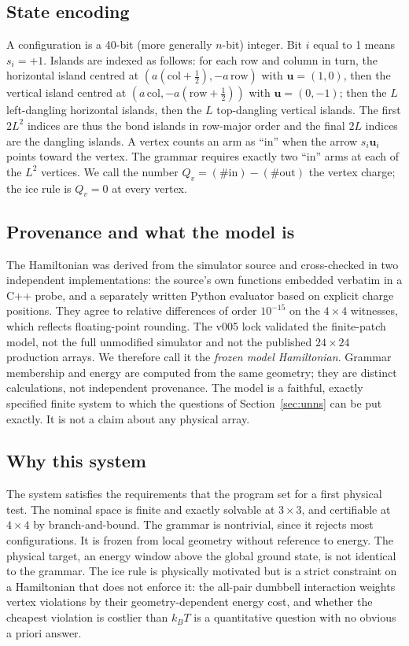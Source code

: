 \documentclass[11pt,a4paper]{article}
\theoremstyle{plain}
\theoremstyle{definition}
\theoremstyle{remark}
\newcommand{\kBT}{k_{B}T}
\begin{document}
\subsection{State encoding}
A configuration is a 40-bit (more generally $n$-bit) integer. Bit $i$ equal to 1 means $s_i=+1$. Islands are indexed as follows: for each row and column in turn, the horizontal island centred at $(a(\mathrm{col}+\tfrac12),-a\,\mathrm{row})$ with $\mathbf u=(1,0)$, then the vertical island centred at $(a\,\mathrm{col},-a(\mathrm{row}+\tfrac12))$ with $\mathbf u=(0,-1)$; then the $L$ left-dangling horizontal islands, then the $L$ top-dangling vertical islands. The first $2L^2$ indices are thus the bond islands in row-major order and the final $2L$ indices are the dangling islands. A vertex counts an arm as ``in'' when the arrow $s_i\mathbf u_i$ points toward the vertex. The grammar requires exactly two ``in'' arms at each of the $L^2$ vertices. We call the number $Q_v=(\#\text{in})-(\#\text{out})$ the vertex charge; the ice rule is $Q_v=0$ at every vertex.

\subsection{Provenance and what the model is}
The Hamiltonian was derived from the simulator source and cross-checked in two independent implementations: the source's own functions embedded verbatim in a C++ probe, and a separately written Python evaluator based on explicit charge positions. They agree to relative differences of order $10^{-15}$ on the $4\times4$ witnesses, which reflects floating-point rounding. The v005 lock validated the finite-patch model, not the full unmodified simulator and not the published $24\times24$ production arrays. We therefore call it the \emph{frozen model Hamiltonian}. Grammar membership and energy are computed from the same geometry; they are distinct calculations, not independent provenance. The model is a faithful, exactly specified finite system to which the questions of Section~\ref{sec:unns} can be put exactly. It is not a claim about any physical array.

\subsection{Why this system}
The system satisfies the requirements that the program set for a first physical test. The nominal space is finite and exactly solvable at $3\times3$, and certifiable at $4\times4$ by branch-and-bound. The grammar is nontrivial, since it rejects most configurations. It is frozen from local geometry without reference to energy. The physical target, an energy window above the global ground state, is not identical to the grammar. The ice rule is physically motivated but is a strict constraint on a Hamiltonian that does not enforce it: the all-pair dumbbell interaction weights vertex violations by their geometry-dependent energy cost, and whether the cheapest violation is costlier than $\kBT$ is a quantitative question with no obvious a priori answer.
\end{document}
